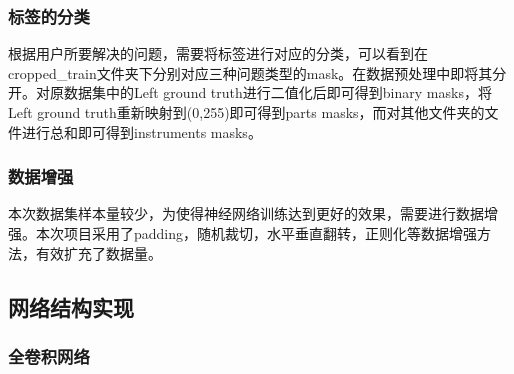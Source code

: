 \documentclass[UTF8]{ctexart}
\begin{document}
\subsubsection{标签的分类}
根据用户所要解决的问题，需要将标签进行对应的分类，可以看到在cropped\_train文件夹下分别对应三种问题类型的mask。在数据预处理中即将其分开。对原数据集中的Left ground truth进行二值化后即可得到binary masks，将Left ground truth重新映射到(0,255)即可得到parts masks，而对其他文件夹的文件进行总和即可得到instruments masks。
\subsubsection{数据增强}
本次数据集样本量较少，为使得神经网络训练达到更好的效果，需要进行数据增强。本次项目采用了padding，随机裁切，水平垂直翻转，正则化等数据增强方法，有效扩充了数据量。

\subsection{网络结构实现}
\subsubsection{全卷积网络}
\end{document}
